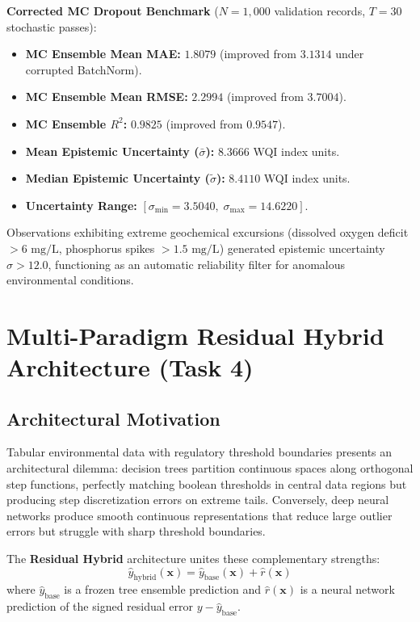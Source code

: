 \documentclass[conference]{IEEEtran}
\begin{document}
\noindent\textbf{Corrected MC Dropout Benchmark} ($N = 1,000$ validation records, $T = 30$ stochastic passes):
\begin{itemize}
  \item \textbf{MC Ensemble Mean MAE:} $\mathbf{1.8079}$ (improved from $3.1314$ under corrupted BatchNorm).
  \item \textbf{MC Ensemble Mean RMSE:} $\mathbf{2.2994}$ (improved from $3.7004$).
  \item \textbf{MC Ensemble $R^2$:} $\mathbf{0.9825}$ (improved from $0.9547$).
  \item \textbf{Mean Epistemic Uncertainty ($\bar{\sigma}$):} $\mathbf{8.3666}$ WQI index units.
  \item \textbf{Median Epistemic Uncertainty ($\tilde{\sigma}$):} $\mathbf{8.4110}$ WQI index units.
  \item \textbf{Uncertainty Range:} $[\sigma_{\min} = 3.5040, \; \sigma_{\max} = 14.6220]$.
\end{itemize}

Observations exhibiting extreme geochemical excursions (dissolved oxygen deficit $> 6\text{ mg/L}$,
phosphorus spikes $> 1.5\text{ mg/L}$) generated epistemic uncertainty $\sigma > 12.0$,
functioning as an automatic reliability filter for anomalous environmental conditions.

\section{Multi-Paradigm Residual Hybrid Architecture (Task 4)}
\label{sec:hybrid}

\subsection{Architectural Motivation}
Tabular environmental data with regulatory threshold boundaries presents an architectural dilemma:
decision trees partition continuous spaces along orthogonal step functions, perfectly matching
boolean thresholds in central data regions but producing step discretization errors on extreme tails.
Conversely, deep neural networks produce smooth continuous representations that reduce large
outlier errors but struggle with sharp threshold boundaries.

The \textbf{Residual Hybrid} architecture unites these complementary strengths:
\begin{equation}
  \hat{y}_{\text{hybrid}}(\mathbf{x}) = \hat{y}_{\text{base}}(\mathbf{x}) + \hat{r}(\mathbf{x})
  \label{eq:hybrid_formulation}
\end{equation}
where $\hat{y}_{\text{base}}$ is a frozen tree ensemble prediction and $\hat{r}(\mathbf{x})$ is a
neural network prediction of the signed residual error $y - \hat{y}_{\text{base}}$.
\end{document}
